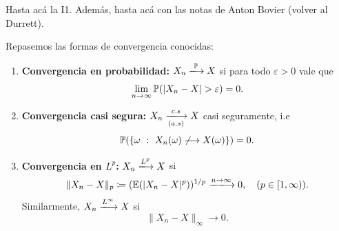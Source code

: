 \begin{note}
	Hasta acá la I1. Además, hasta acá con las notas de Anton Bovier (volver al Durrett).
\end{note}

\noindent Repasemos las formas de convergencia conocidas:

\begin{enumerate}
	\item \textbf{Convergencia en probabilidad:} $X_{n} \xlongrightarrow{\mbb{P}} X$ si para todo $\varepsilon > 0$ vale que
	\[ \lim_{n \to \infty} \mathbb{P}(|X_{n} - X| > \varepsilon) = 0. \]

	\item \textbf{Convergencia casi segura:} $X_{n} \xlongrightarrow[(a.s)]{c.s} X$ casi seguramente, i.e
	\[ \mbb{P}(\{\omega \ : \ X_{n}(\omega) \not\longrightarrow X(\omega) \}) = 0. \] 

	\item \textbf{Convergencia en $L^{p}$:} $X_{n} \xlongrightarrow{L^{p}} X$ si 
	\[ \| X_{n} - X \|_{p} \coloneq (\mbb{E}(|X_{n} - X|^{p}))^{1 \slash p} \xlongrightarrow{n \to \infty} 0, \quad (p \in [1, \infty)). \]
	Similarmente, $X_{n} \xlongrightarrow{L^{\infty}} X$ si 
	\[ \| X_{n} - X \|_{\infty} \longrightarrow 0. \]
\end{enumerate}

